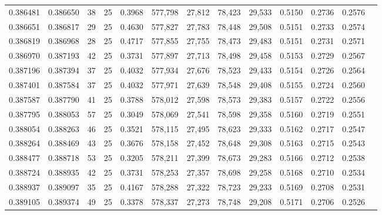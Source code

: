 \begin{tabular}{rrrrrrrrrrrrr}
0.386481 & 0.386650 &    38 &  25 &                                     0.3968 & 577,798 &  27,812 &  78,423 &  29,533 & 0.5150 & 0.2736 & 0.2576 \\
0.386651 & 0.386817 &    29 &  25 &                                     0.4630 & 577,827 &  27,783 &  78,448 &  29,508 & 0.5151 & 0.2733 & 0.2574 \\
0.386819 & 0.386968 &    28 &  25 &                                     0.4717 & 577,855 &  27,755 &  78,473 &  29,483 & 0.5151 & 0.2731 & 0.2571 \\
0.386970 & 0.387193 &    42 &  25 &                                     0.3731 & 577,897 &  27,713 &  78,498 &  29,458 & 0.5153 & 0.2729 & 0.2567 \\
0.387196 & 0.387394 &    37 &  25 &                                     0.4032 & 577,934 &  27,676 &  78,523 &  29,433 & 0.5154 & 0.2726 & 0.2564 \\
0.387401 & 0.387584 &    37 &  25 &                                     0.4032 & 577,971 &  27,639 &  78,548 &  29,408 & 0.5155 & 0.2724 & 0.2560 \\
0.387587 & 0.387790 &    41 &  25 &                                     0.3788 & 578,012 &  27,598 &  78,573 &  29,383 & 0.5157 & 0.2722 & 0.2556 \\
0.387795 & 0.388053 &    57 &  25 &                                     0.3049 & 578,069 &  27,541 &  78,598 &  29,358 & 0.5160 & 0.2719 & 0.2551 \\
0.388054 & 0.388263 &    46 &  25 &                                     0.3521 & 578,115 &  27,495 &  78,623 &  29,333 & 0.5162 & 0.2717 & 0.2547 \\
0.388264 & 0.388469 &    43 &  25 &                                     0.3676 & 578,158 &  27,452 &  78,648 &  29,308 & 0.5163 & 0.2715 & 0.2543 \\
0.388477 & 0.388718 &    53 &  25 &                                     0.3205 & 578,211 &  27,399 &  78,673 &  29,283 & 0.5166 & 0.2712 & 0.2538 \\
0.388724 & 0.388935 &    42 &  25 &                                     0.3731 & 578,253 &  27,357 &  78,698 &  29,258 & 0.5168 & 0.2710 & 0.2534 \\
0.388937 & 0.389097 &    35 &  25 &                                     0.4167 & 578,288 &  27,322 &  78,723 &  29,233 & 0.5169 & 0.2708 & 0.2531 \\
0.389105 & 0.389374 &    49 &  25 &                                     0.3378 & 578,337 &  27,273 &  78,748 &  29,208 & 0.5171 & 0.2706 & 0.2526 \\

\end{tabular}
